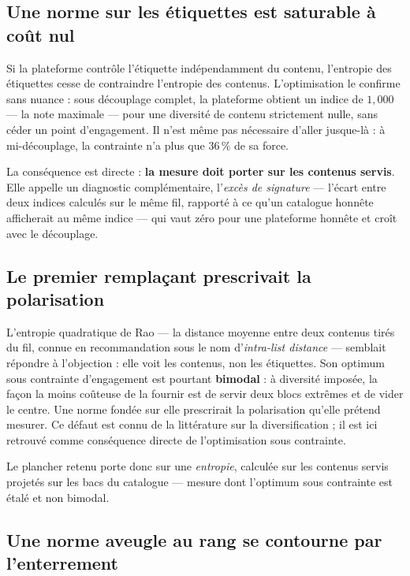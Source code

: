 \documentclass[11pt,a4paper]{article}
\begin{document}
\subsection{Une norme sur les étiquettes est saturable à coût nul}

Si la plateforme contrôle l'étiquette indépendamment du contenu, l'entropie des étiquettes
cesse de contraindre l'entropie des contenus. L'optimisation le confirme sans nuance : sous
découplage complet, la plateforme obtient un indice de $1{,}000$ --- la note maximale --- pour
une diversité de contenu strictement nulle, sans céder un point d'engagement. Il n'est même
pas nécessaire d'aller jusque-là : à mi-découplage, la contrainte n'a plus que $36\,\%$ de sa
force.

La conséquence est directe : \textbf{la mesure doit porter sur les contenus servis}. Elle
appelle un diagnostic complémentaire, l'\emph{excès de signature} --- l'écart entre deux
indices calculés sur le même fil, rapporté à ce qu'un catalogue honnête afficherait au même
indice --- qui vaut zéro pour une plateforme honnête et croît avec le découplage.

\subsection{Le premier remplaçant prescrivait la polarisation}

L'entropie quadratique de Rao \citep{rao1982} --- la distance moyenne entre deux contenus
tirés du fil, connue en recommandation sous le nom d'\emph{intra-list distance} --- semblait
répondre à l'objection : elle voit les contenus, non les étiquettes. Son optimum sous
contrainte d'engagement est pourtant \textbf{bimodal} : à diversité imposée, la façon la
moins coûteuse de la fournir est de servir deux blocs extrêmes et de vider le centre. Une
norme fondée sur elle prescrirait la polarisation qu'elle prétend mesurer. Ce défaut est
connu de la littérature sur la diversification \citep{ohsaka2023} ; il est ici retrouvé
comme conséquence directe de l'optimisation sous contrainte.

Le plancher retenu porte donc sur une \emph{entropie}, calculée sur les contenus servis
projetés sur les bacs du catalogue --- mesure dont l'optimum sous contrainte est étalé et
non bimodal.

\subsection{Une norme aveugle au rang se contourne par l'enterrement}
\end{document}
